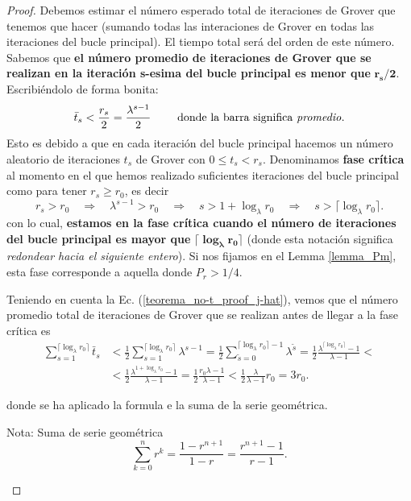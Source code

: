 \documentclass[a4paper,11pt]{book} %
\numberwithin{equation}{chapter}
\def\rqa{\quad \Rightarrow \quad}
\begin{document}
\begin{proof}
Debemos estimar el número esperado total de iteraciones de Grover que tenemos que hacer (sumando todas las interaciones de Grover en todas las iteraciones del bucle principal). El tiempo total será del orden de este número. Sabemos que \textbf{el número promedio de iteraciones de Grover que se realizan en la iteración s-esima del bucle principal es menor que} $\bm{r_s/2}$. Escribiéndolo de forma bonita:
\begin{equation} \label{teorema_no-t_proof_j-hat}
\bar{t}_s < \frac{r_s}{2} = \frac{\lambda^{s-1}}{2} \qquad \text{ donde la barra significa \textit{promedio}}.
\end{equation} 
Esto es debido a que en cada iteración del bucle principal hacemos un número aleatorio de iteraciones $t_s$ de Grover con $0 \leq t_s < r_s$.  Denominamos \textbf{fase crítica} al momento en el que hemos realizado suficientes iteraciones del bucle principal como para tener $r_s \geq r_0$, es decir
\begin{equation} 
r_s > r_0 \rqa \lambda^{s-1} > r_0 \rqa s > 1 + \log_{\lambda} r_0  \rqa s > \lceil \log_\lambda r_0 \rceil.
\end{equation}
con lo cual, \textbf{estamos en la fase crítica cuando el número de iteraciones del bucle principal es mayor que} $\bm{\lceil \log_{\lambda} r_0 \rceil}$ (donde esta notación significa \textit{redondear hacia el siguiente entero}).  Si nos fijamos en el Lemma \ref{lemma_Pm}, esta fase corresponde a aquella donde $P_r > 1/4$.

Teniendo en cuenta la Ec. (\ref{teorema_no-t_proof_j-hat}), vemos que el número promedio total de iteraciones de Grover que se realizan antes de llegar a la fase crítica es
\begin{equation} \label{teorema_no-t_3r0}
\begin{split}
\sum_{s=1}^{\lceil \log_\lambda r_0 \rceil} \bar{t}_s 
& < \frac{1}{2} \sum_{s=1}^{\lceil \log_\lambda r_0 \rceil} \lambda^{s-1} 
= \frac{1}{2} \sum_{\tilde{s}=0}^{\lceil \log_\lambda r_0 \rceil-1} \lambda^{\tilde{s}}  = \frac{1}{2} \frac{ \lambda^{\lceil \log_\lambda r_0 \rceil} -1 }{\lambda -1 }  < \\
& < \frac{1}{2} \frac{\lambda^{1 + \log_\lambda r_0} -1 }{\lambda -1} = \frac{1}{2} \frac{r_0 \lambda -1 }{\lambda  -1 }  < 
 \frac{1}{2} \frac{\lambda}{\lambda - 1} r_0 = \boxed{3 r_0}.
\end{split}
\end{equation}

donde se ha aplicado la formula e la suma de la serie geométrica.
\begin{mybox_blue}{Nota: Suma de serie geométrica}
\begin{equation} \label{ec_no-t_suma-geometrica}
\sum_{k=0}^n r^k = \frac{1-r^{n+1}}{1-r} = \frac{r^{n+1} -1 }{r -1}.
\end{equation}
\end{mybox_blue}


\end{proof}
\end{document}
